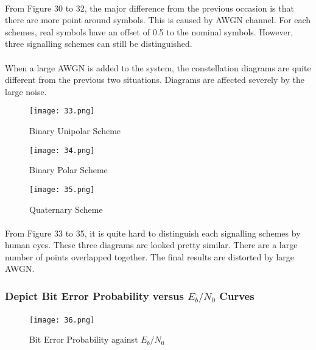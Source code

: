 \documentclass[12pt]{article}
\begin{document}
    \paragraph{}
    From Figure 30 to 32, the major difference from the previous occasion is that there are more point around symbols. This is caused by AWGN channel. For each schemes, real symbols have an offset of 0.5 to the nominal symbols. However, three signalling schemes can still be distinguished.
    
    \paragraph{}
    When a large AWGN is added to the system, the constellation diagrams are quite different from the previous two situations. Diagrams are affected severely by the large noise.
    \begin{figure}[htbp]
    \begin{minipage}[t]{0.3\linewidth}
    \centering
    \texttt{[image: 33.png]}
    \caption{Binary Unipolar Scheme}
    \label{fig:side:a}
    \end{minipage}
    \begin{minipage}[t]{0.3\linewidth}
    \centering
    \texttt{[image: 34.png]}
    \caption{Binary Polar Scheme}
    \end{minipage}
    \begin{minipage}[t]{0.3\linewidth}
    \centering
    \texttt{[image: 35.png]}
    \caption{Quaternary Scheme}
    \label{}
    \end{minipage}
    \end{figure}
    \paragraph{}
    From Figure 33 to 35, it is quite hard to distinguish each signalling schemes by human eyes. These three diagrams are looked pretty similar. There are a large number of points overlapped together. The final results are distorted by large AWGN.
    
    
    
    
    
    
    \subsubsection{Depict Bit Error Probability versus $E_b/N_0$ Curves}
    \paragraph{}
    \begin{figure}[H]
    \centering
    \texttt{[image: 36.png]}
    \caption{Bit Error Probability against $E_b/N_0$}
    \end{figure}
\end{document}
